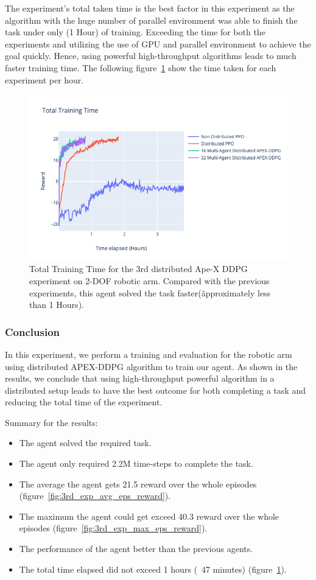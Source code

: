 The experiment's total taken time is the best factor in this experiment as the algorithm with the huge number of parallel environment was able to finish the task under only (1 Hour) of training. Exceeding the time for both the experiments and utilizing the use of GPU and parallel environment to achieve the goal quickly. Hence, using powerful high-throughput algorithms leads to much faster training time. The following figure~\ref{fig:3rd_exp_total_training_time} show the time taken for each experiment per hour.
\begin{figure}[H] %
	\centering
	\includegraphics[width=1.2\linewidth]{figures/exps/3rd_exp/total_training_time.png}
	\caption{Total Training Time for the 3rd distributed Ape-X DDPG experiment on 2-DOF robotic arm. Compared with the previous experiments, this agent solved the task faster(\~approximately less than 1 Hours).}
	\label{fig:3rd_exp_total_training_time}
\end{figure}


\subsubsection{Conclusion}

In this experiment, we perform a training and evaluation for the robotic arm using distributed APEX-DDPG algorithm to train our agent. As shown in the results, we conclude that using high-throughput powerful algorithm in a distributed setup leads to have the best outcome for both completing a task and reducing the total time of the experiment.

Summary for the results:
\begin{itemize}
	\item The agent solved the required task.
	\item The agent only required 2.2M time-steps to complete the task.
	\item The average the agent gets 21.5 reward over the whole episodes (figure~\ref{fig:3rd_exp_avg_eps_reward}).
	\item The maximum the agent could get exceed 40.3 reward over the whole episodes (figure~\ref{fig:3rd_exp_max_eps_reward}).
	\item The performance of the agent better than the previous agents.
	\item The total time elapsed did not exceed 1 hours (~47 minutes) (figure~\ref{fig:3rd_exp_total_training_time}).
\end{itemize}